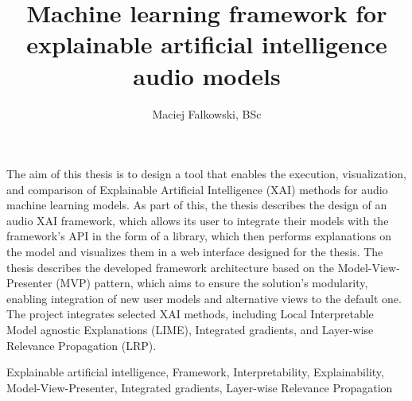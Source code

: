 \documentclass[
    bindingoffset=5mm,  %
    footnoteindent=3mm, %
    hyphenation=true    %
]{src/wut-thesis}
\begin{document}
\title{
    Machine learning framework for explainable artificial intelligence audio models
}
\author{Maciej Falkowski, BSc}
\date{\the\year}
\maketitle

\cleardoublepage %
\abstract

The aim of this thesis is to design a tool that enables the execution, visualization, and comparison of
Explainable Artificial Intelligence (XAI) methods for audio machine learning models. As part of this,
the thesis describes the design of an audio XAI framework, which allows its user to integrate their models
with the framework's API in the form of a library, which then performs explanations on the model and visualizes
them in a web interface designed for the thesis. The thesis describes the developed framework architecture
based on the Model-View-Presenter (MVP) pattern, which aims to ensure the solution's modularity, enabling
integration of new user models and alternative views to the default one. The project integrates selected
XAI methods, including Local Interpretable Model agnostic Explanations (LIME), Integrated gradients,
and Layer-wise Relevance Propagation (LRP).

\keywords Explainable artificial intelligence, Framework, Interpretability, Explainability, Model-View-Presenter, Integrated gradients, Layer-wise Relevance Propagation

\clearpage
\secondabstract
\end{document}

